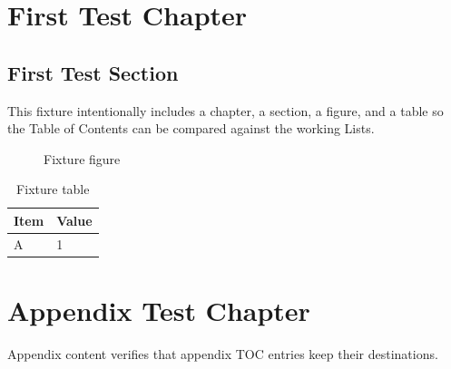 \documentclass{../ndsudisq}
\begin{document}
\makefrontmatter
\mainmattersetup

\chapter{First Test Chapter}
\section{First Test Section}
This fixture intentionally includes a chapter, a section, a figure, and a table
so the Table of Contents can be compared against the working Lists.

\begin{figure}[htbp]
  \centering
  \fbox{\rule{0pt}{0.75in}\rule{1.5in}{0pt}}
  \caption{Fixture figure}
\end{figure}

\begin{table}[htbp]
  \centering
  \caption{Fixture table}
  \begin{tabular}{ll}
    \toprule
    Item & Value \\
    \midrule
    A & 1 \\
    \bottomrule
  \end{tabular}
\end{table}

\appendicesmatter
\chapter{Appendix Test Chapter}
Appendix content verifies that appendix TOC entries keep their destinations.
\end{document}
